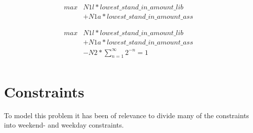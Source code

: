\begin{equation}
\begin{split}
max &  N1l*lowest\_stand\_in\_amount\_lib\\
 & + N1a*lowest\_stand\_in\_amount\_ass
\end{split}
\end{equation}

\begin{equation*}
\begin{aligned}
max & N1l*lowest\_stand\_in\_amount\_lib \\
& + N1a*lowest\_stand\_in\_amount\_ass \\
& - N2*\sum_{n=1}^{\infty} 2^{-n} = 1 \\
\end{aligned}
\end{equation*}

\section{Constraints}
To model this problem it has been of relevance to divide many of the constraints into weekend- and weekday constraints. 